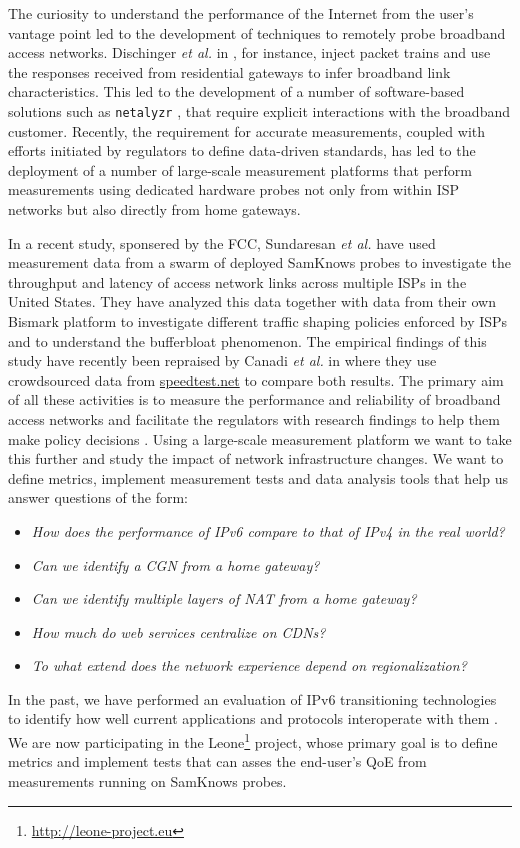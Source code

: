 The curiosity to understand the performance of the Internet from the user's
vantage point led to the development of techniques to remotely probe broadband
access networks. Dischinger \emph{et al.} in \cite{dischinger:2007}, for
instance, inject packet trains and use the responses received from residential
gateways to infer broadband link characteristics. This led to the development
of a number of software-based solutions such as \texttt{netalyzr}
\cite{kreibich:2010}, that require explicit interactions with the broadband
customer. Recently, the requirement for accurate measurements, coupled with
efforts initiated by regulators to define data-driven standards, has led to
the deployment of a number of large-scale measurement platforms that perform
measurements using dedicated hardware probes not only from within ISP networks
but also directly from home gateways.

In a recent study, sponsered by the FCC, Sundaresan \emph{et al.}
\cite{sundaresan:2011} have used measurement data from a swarm of deployed
SamKnows probes to investigate the throughput and latency of access network
links across multiple ISPs in the United States. They have analyzed this data
together with data from their own Bismark platform to investigate different
traffic shaping policies enforced by ISPs and to understand the bufferbloat
phenomenon. The empirical findings of this study have recently been repraised
by Canadi \emph{et al.} in \cite{canadi:2012} where they use crowdsourced data
from \url{speedtest.net} to compare both results. The primary aim of all these
activities is to measure the performance and reliability of broadband access
networks and facilitate the regulators with research findings to help them
make policy decisions \cite{draft-schulzrinne-lmap-requirements-00}.  Using a
large-scale measurement platform we want to take this further and study the
impact of network infrastructure changes. We want to define metrics, implement
measurement tests and data analysis tools that help us answer questions of the
form:

\begin{itemize}
  \item \emph{How does the performance of IPv6 compare to that of IPv4 in the real world?}
  \item \emph{Can we identify a \ac{CGN} from a home gateway?}
  \item \emph{Can we identify multiple layers of NAT from a home gateway?}
  \item \emph{How much do web services centralize on \ac{CDN}s?}
  \item \emph{To what extend does the network experience depend on regionalization?}
\end{itemize}

In the past, we have performed an evaluation of IPv6 transitioning
technologies to identify how well current applications and protocols
interoperate with them \cite{vbajpai:2012}. We are now participating in the
Leone\footnote{\url{http://leone-project.eu}} project, whose primary goal is
to define metrics and implement tests that can asses the end-user's \ac{QoE}
from measurements running on SamKnows probes.
